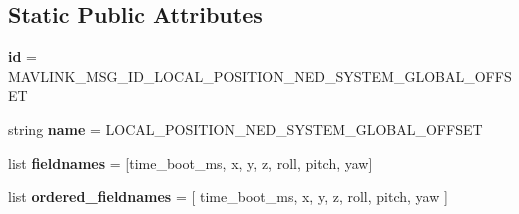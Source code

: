 \subsection*{Static Public Attributes}
\begin{DoxyCompactItemize}
\item 
\mbox{\label{classpymavlink_1_1dialects_1_1v10_1_1MAVLink__local__position__ned__system__global__offset__message_a377c4bdbbaa303a25a9e5621479e7232}} 
{\bfseries id} = M\+A\+V\+L\+I\+N\+K\+\_\+\+M\+S\+G\+\_\+\+I\+D\+\_\+\+L\+O\+C\+A\+L\+\_\+\+P\+O\+S\+I\+T\+I\+O\+N\+\_\+\+N\+E\+D\+\_\+\+S\+Y\+S\+T\+E\+M\+\_\+\+G\+L\+O\+B\+A\+L\+\_\+\+O\+F\+F\+S\+ET
\item 
\mbox{\label{classpymavlink_1_1dialects_1_1v10_1_1MAVLink__local__position__ned__system__global__offset__message_ab89737f207c623f27dde24e725cc288b}} 
string {\bfseries name} = \textquotesingle{}L\+O\+C\+A\+L\+\_\+\+P\+O\+S\+I\+T\+I\+O\+N\+\_\+\+N\+E\+D\+\_\+\+S\+Y\+S\+T\+E\+M\+\_\+\+G\+L\+O\+B\+A\+L\+\_\+\+O\+F\+F\+S\+ET\textquotesingle{}
\item 
\mbox{\label{classpymavlink_1_1dialects_1_1v10_1_1MAVLink__local__position__ned__system__global__offset__message_ade0431fcf360973f727b0288d4fd088a}} 
list {\bfseries fieldnames} = \mbox{[}\textquotesingle{}time\+\_\+boot\+\_\+ms\textquotesingle{}, \textquotesingle{}x\textquotesingle{}, \textquotesingle{}y\textquotesingle{}, \textquotesingle{}z\textquotesingle{}, \textquotesingle{}roll\textquotesingle{}, \textquotesingle{}pitch\textquotesingle{}, \textquotesingle{}yaw\textquotesingle{}\mbox{]}
\item 
\mbox{\label{classpymavlink_1_1dialects_1_1v10_1_1MAVLink__local__position__ned__system__global__offset__message_ad3e27649c484ac0527a9837fe09c3574}} 
list {\bfseries ordered\+\_\+fieldnames} = \mbox{[} \textquotesingle{}time\+\_\+boot\+\_\+ms\textquotesingle{}, \textquotesingle{}x\textquotesingle{}, \textquotesingle{}y\textquotesingle{}, \textquotesingle{}z\textquotesingle{}, \textquotesingle{}roll\textquotesingle{}, \textquotesingle{}pitch\textquotesingle{}, \textquotesingle{}yaw\textquotesingle{} \mbox{]}

\end{DoxyCompactItemize}
